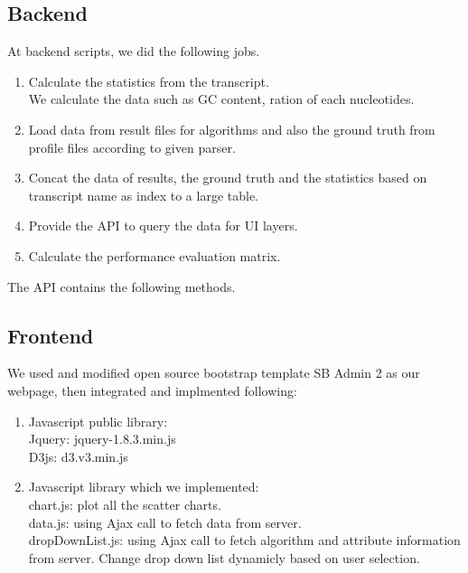 \documentclass[11pt,letter]{article}
\begin{document}
\subsection {Backend}
At backend scripts, we did the following jobs.
\begin{enumerate}
\item Calculate the statistics from the transcript. \\
We calculate the data such as GC content, ration of each nucleotides.
\item Load data from result files for algorithms and also the ground truth from profile files according to given parser.
\item Concat the data of results, the ground truth and the statistics based on transcript name as index to a large table.
\item Provide the API to query the data for UI layers.
\item Calculate the performance evaluation matrix.
\end{enumerate}
The API contains the following methods.

\subsection {Frontend}
We used and modified open source bootstrap template SB Admin 2 \cite{sb_admin_2} as our webpage, then integrated and implmented following:\\
\begin{enumerate}
\item Javascript public library:\\
Jquery: jquery-1.8.3.min.js\\
D3js: d3.v3.min.js \cite{d3_scatterplot}\\
\item Javascript library which we implemented:\\
chart.js:  plot all the scatter charts.\\
data.js: using Ajax call to fetch data from server.\\
dropDownList.js: using Ajax call to fetch algorithm and attribute information from server. Change drop down list dynamicly based on user selection.\\
\end{enumerate}
\end{document}
